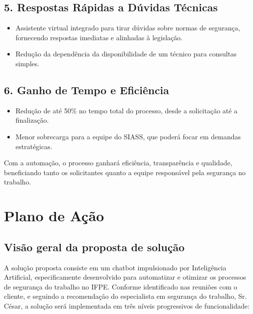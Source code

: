 \documentclass[12pt,a4paper]{article}
\begin{document}
\subsection{5. Respostas Rápidas a Dúvidas Técnicas}
\begin{itemize}
    \item Assistente virtual integrado para tirar dúvidas sobre normas de segurança, fornecendo respostas imediatas e alinhadas à legislação.
    \item Redução da dependência da disponibilidade de um técnico para consultas simples.
\end{itemize}

\subsection{6. Ganho de Tempo e Eficiência}
\begin{itemize}
    \item Redução de até 50\% no tempo total do processo, desde a solicitação até a finalização.
    \item Menor sobrecarga para a equipe do SIASS, que poderá focar em demandas estratégicas.
\end{itemize}

Com a automação, o processo ganhará eficiência, transparência e qualidade, beneficiando tanto os solicitantes quanto a equipe responsável pela segurança no trabalho.

\clearpage
\section{Plano de Ação}

\subsection{Visão geral da proposta de solução}

A solução proposta consiste em um chatbot impulsionado por Inteligência Artificial, especificamente desenvolvido para automatizar e otimizar os processos de segurança do trabalho no IFPE. Conforme identificado nas reuniões com o cliente, e seguindo a recomendação do especialista em segurança do trabalho, Sr. César, a solução será implementada em três níveis progressivos de funcionalidade:
\end{document}
